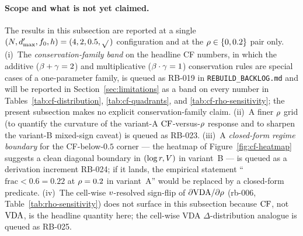 \paragraph{Scope and what is not yet claimed.}
The results in this subsection are reported at a single
$(N, d'_{\max}, f_0, h) = (4, 2, 0.5, \sqrt{}\,)$
configuration and at the $\rho \in \{0, 0.2\}$ pair only. (i)~The
\emph{conservation-family band} on the headline CF numbers, in
which the additive ($\beta + \gamma = 2$) and multiplicative
($\beta \cdot \gamma = 1$) conservation rules are special cases
of a one-parameter family, is queued as RB-019 in
\texttt{REBUILD\_BACKLOG.md} and will be reported in
Section~\ref{sec:limitations} as a band on every number in
Tables~\ref{tab:cf-distribution}, \ref{tab:cf-quadrants}, and
\ref{tab:cf-rho-sensitivity}; the present subsection makes no
explicit conservation-family claim. (ii)~A finer $\rho$ grid (to
quantify the curvature of the variant-A $\mathrm{CF}$-versus-$\rho$
response and to sharpen the variant-B mixed-sign caveat) is queued
as RB-023. (iii)~A \emph{closed-form regime boundary} for the
CF-below-$0.5$ corner --- the heatmap of
Figure~\ref{fig:cf-heatmap} suggests a clean diagonal boundary in
$(\log r, V)$ in variant~B --- is queued as a derivation
increment RB-024; if it lands, the empirical statement
``$\mathrm{frac}\!<\!0.6 = 0.22$ at $\rho = 0.2$ in variant~A''
would be replaced by a closed-form predicate. (iv)~The cell-wise
$v$-resolved sign-flip of $\partial \mathrm{VDA} / \partial \rho$
(rb-006, Table~\ref{tab:rho-sensitivity}) does not surface in this
subsection because $\mathrm{CF}$, not $\mathrm{VDA}$, is the headline quantity here;
the cell-wise VDA $\Delta$-distribution analogue is queued as RB-025.

